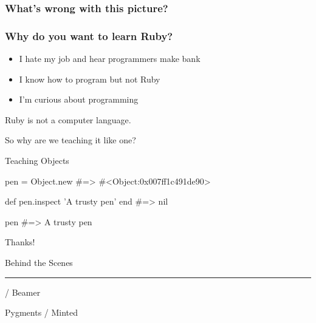 \documentclass[20pt]{beamer}
\begin{document}
\begin{frame}
	\frametitle{What's wrong with this picture?}

\end{frame}

\begin{frame}
	\frametitle{Why do you want to learn Ruby?}

	\begin{itemize}
		\item I hate my job and hear programmers make bank
		\item I know how to program but not Ruby
		\item I'm curious about programming
	\end{itemize}
\end{frame}


\begin{frame}
	\par {Ruby is not a computer language.}
	\vspace{4cm}\pause
	\par {So why are we teaching it like one?}
\end{frame}

\begin{frame}
	\par{ Teaching Objects}
	\par\vspace{3cm}
\end{frame}

\begin{frame}[fragile]
	\begin{rubycode}
pen = Object.new
#=> #<Object:0x007ff1c491de90>

def pen.inspect
'A trusty pen'
end
#=> nil

pen
#=> A trusty pen
	\end{rubycode}
\end{frame}

\begin{frame}
\end{frame}


\begin{frame}
	\begin{center}
		\vspace{2.5cm}
		{Thanks!}
		\vspace{1.5cm}

		Behind the Scenes
		\par\rule[3mm]{3cm}{0.1mm}

		\XeLaTeX / Beamer

		Pygments / Minted
	\end{center}
\end{frame}
\end{document}
